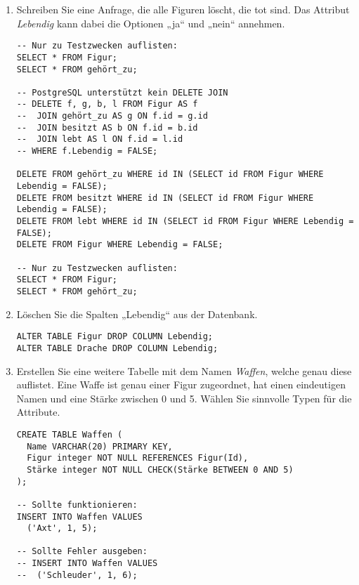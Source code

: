 \documentclass{lehramt-informatik-aufgabe}
\begin{document}
\begin{enumerate}
%

\item Schreiben Sie eine Anfrage, die alle Figuren löscht, die tot sind.
Das Attribut \emph{Lebendig} kann dabei die Optionen „ja“ und „nein“
annehmen.

\begin{liAntwort}
\begin{verbatim}
-- Nur zu Testzwecken auflisten:
SELECT * FROM Figur;
SELECT * FROM gehört_zu;

-- PostgreSQL unterstützt kein DELETE JOIN
-- DELETE f, g, b, l FROM Figur AS f
--  JOIN gehört_zu AS g ON f.id = g.id
--  JOIN besitzt AS b ON f.id = b.id
--  JOIN lebt AS l ON f.id = l.id
-- WHERE f.Lebendig = FALSE;

DELETE FROM gehört_zu WHERE id IN (SELECT id FROM Figur WHERE Lebendig = FALSE);
DELETE FROM besitzt WHERE id IN (SELECT id FROM Figur WHERE Lebendig = FALSE);
DELETE FROM lebt WHERE id IN (SELECT id FROM Figur WHERE Lebendig = FALSE);
DELETE FROM Figur WHERE Lebendig = FALSE;

-- Nur zu Testzwecken auflisten:
SELECT * FROM Figur;
SELECT * FROM gehört_zu;
\end{verbatim}
\end{liAntwort}

%

\item Löschen Sie die Spalten „Lebendig“ aus der Datenbank.

\begin{liAntwort}
\begin{verbatim}
ALTER TABLE Figur DROP COLUMN Lebendig;
ALTER TABLE Drache DROP COLUMN Lebendig;
\end{verbatim}
\end{liAntwort}

%

\item Erstellen Sie eine weitere Tabelle mit dem Namen \emph{Waffen},
welche genau diese auflistet. Eine Waffe ist genau einer Figur
zugeordnet, hat einen eindeutigen Namen und eine Stärke zwischen 0 und
5. Wählen Sie sinnvolle Typen für die Attribute.

\begin{liAntwort}
\begin{verbatim}
CREATE TABLE Waffen (
  Name VARCHAR(20) PRIMARY KEY,
  Figur integer NOT NULL REFERENCES Figur(Id),
  Stärke integer NOT NULL CHECK(Stärke BETWEEN 0 AND 5)
);

-- Sollte funktionieren:
INSERT INTO Waffen VALUES
  ('Axt', 1, 5);

-- Sollte Fehler ausgeben:
-- INSERT INTO Waffen VALUES
--  ('Schleuder', 1, 6);
\end{verbatim}
\end{liAntwort}
\end{enumerate}
\end{document}
